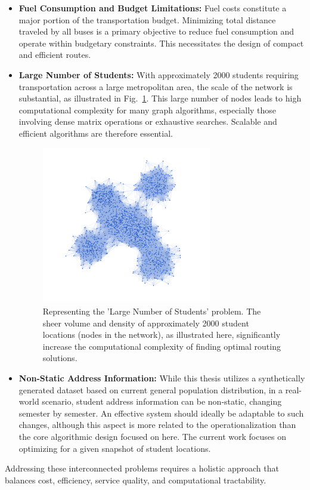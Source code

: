 \begin{itemize}
    \item \textbf{Fuel Consumption and Budget Limitations:} Fuel costs constitute a major portion of the transportation budget. Minimizing total distance traveled by all buses is a primary objective to reduce fuel consumption and operate within budgetary constraints. This necessitates the design of compact and efficient routes.

    \item \textbf{Large Number of Students:} With approximately 2000 students requiring transportation across a large metropolitan area, the scale of the network is substantial, as illustrated in Fig.~\ref{fig:problem_large_scale}. This large number of nodes leads to high computational complexity for many graph algorithms, especially those involving dense matrix operations or exhaustive searches. Scalable and efficient algorithms are therefore essential.
    \begin{figure}[!htbp]
        \centering
        \includegraphics[width=0.7\textwidth]{img/large_scale_students.png}
        \caption{Representing the 'Large Number of Students' problem. The sheer volume and density of approximately 2000 student locations (nodes in the network), as illustrated here, significantly increase the computational complexity of finding optimal routing solutions.}
        \label{fig:problem_large_scale}
    \end{figure}

    \item \textbf{Non-Static Address Information:} While this thesis utilizes a synthetically generated dataset based on current general population distribution, in a real-world scenario, student address information can be non-static, changing semester by semester. An effective system should ideally be adaptable to such changes, although this aspect is more related to the operationalization than the core algorithmic design focused on here. The current work focuses on optimizing for a given snapshot of student locations.
\end{itemize}
Addressing these interconnected problems requires a holistic approach that balances cost, efficiency, service quality, and computational tractability.

